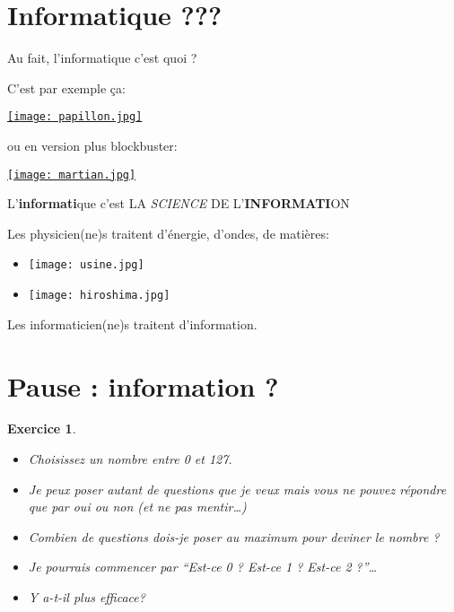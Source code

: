 \documentclass[french]{beamer}
\newtheorem{exercice}{Exercice}
\begin{document}
\section{Informatique ???}

\begin{frame}
Au fait, l'informatique c'est quoi ?

C'est par exemple ça:
 \begin{center}
\href{https://www.youtube.com/embed/jpfHxfF-Kno}{\texttt{[image: papillon.jpg]}}
\end{center}
\end{frame}

\begin{frame}
ou en version plus blockbuster:
 \begin{center}
\href{https://www.youtube.com/embed/ffB0Je-xjKg}{\texttt{[image: martian.jpg]}}
\end{center}
\end{frame}

\begin{frame}
L'\textbf{informati}que c'est LΑ \emph{SCIENCΕ} DΕ
L'\textbf{INFORMATI}ON
\end{frame}

\begin{frame}
Les physicien(ne)s traitent d'énergie, d'ondes, de matières:

\begin{itemize}
\item \texttt{[image: usine.jpg]}

\item \texttt{[image: hiroshima.jpg]}
\end{itemize}



Les informaticien(ne)s traitent d'information.

\end{frame}

\section{Pause : information ?}


\begin{frame}
  \begin{exercice}
    \begin{itemize}
    \item Choisissez un nombre entre 0 et 127.

\item Je peux poser autant de questions que je veux mais vous ne pouvez
répondre que par oui ou non (et ne pas mentir\ldots{})

\item Combien de questions dois-je poser au maximum pour deviner le nombre ?

\item Je pourrais commencer par ``Est-ce 0 ? Est-ce 1 ? Est-ce 2 ?''\ldots{}
\item Y a-t-il plus efficace?
\end{itemize}
\end{exercice}
\end{frame}
\end{document}
